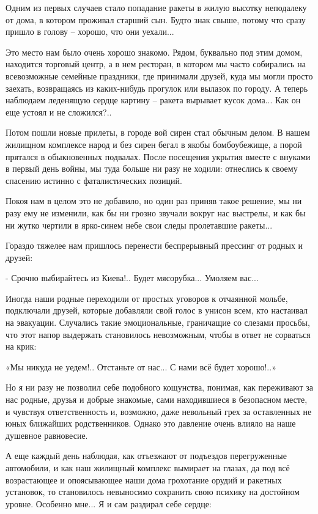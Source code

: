 Одним из первых случаев стало попадание ракеты в жилую высотку неподалеку от
дома, в котором проживал старший сын. Будто знак свыше, потому что сразу пришло
в голову – хорошо, что они уехали...

Это место нам было очень хорошо знакомо. Рядом, буквально под этим домом,
находится торговый центр, а в нем ресторан, в котором мы часто собирались на
всевозможные семейные праздники, где принимали друзей, куда мы могли просто
заехать, возвращаясь из каких-нибудь прогулок или вылазок по городу. А теперь
наблюдаем леденящую сердце картину – ракета вырывает кусок дома... Как он еще
устоял и не сложился?..

Потом пошли новые прилеты, в городе вой сирен стал обычным делом. В нашем
жилищном комплексе народ и без сирен бегал в якобы бомбоубежище, а порой
прятался в обыкновенных подвалах. После посещения укрытия вместе с внуками в
первый день войны, мы туда больше ни разу не ходили: отнеслись к своему
спасению истинно с фаталистических позиций.

Покоя нам в целом это не добавило, но один раз приняв такое решение, мы ни разу
ему не изменили, как бы ни грозно звучали вокруг нас выстрелы, и как бы ни
жутко чертили в ярко-синем небе свои следы пролетавшие ракеты...

Гораздо тяжелее нам пришлось перенести беспрерывный прессинг от родных и
друзей:

- Срочно выбирайтесь из Киева!.. Будет мясорубка... Умоляем вас...

Иногда наши родные переходили от простых уговоров к отчаянной мольбе,
подключали друзей, которые добавляли свой голос в унисон всем, кто настаивал на
эвакуации. Случались такие эмоциональные, граничащие со слезами просьбы, что
этот напор выдержать становилось невозможным, чтобы в ответ не сорваться на
крик:

«Мы никуда не уедем!.. Отстаньте от нас... С нами всё будет хорошо!..»

Но я ни разу не позволил себе подобного кощунства, понимая, как переживают за
нас родные, друзья и добрые знакомые, сами находившиеся в безопасном месте, и
чувствуя ответственность и, возможно, даже невольный грех за оставленных не
юных ближайших родственников. Однако это давление очень влияло на наше душевное
равновесие.

А еще каждый день наблюдая, как отъезжают от подъездов перегруженные
автомобили, и как наш жилищный комплекс вымирает на глазах, да под всё
возрастающее и опоясывающее наши дома грохотание орудий и ракетных установок,
то становилось невыносимо сохранить свою психику на достойном уровне. Особенно
мне... Я и сам раздирал себе сердце:

